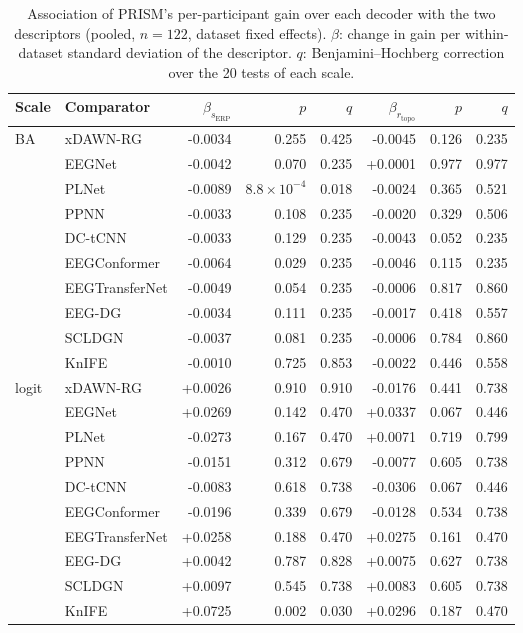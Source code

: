 \begin{table}[H]
\centering
\caption{Association of PRISM's per-participant gain over each decoder with the two descriptors (pooled, $n=122$, dataset fixed effects). $\beta$: change in gain per within-dataset standard deviation of the descriptor. $q$: Benjamini--Hochberg correction over the 20 tests of each scale.}
\label{tab:supp-gains}
\scriptsize
\begin{adjustbox}{max width=\textwidth}
\begin{tabular}{@{}llrrrrrr@{}}
\toprule
Scale & Comparator & $\beta_{s_\mathrm{ERP}}$ & $p$ & $q$ & $\beta_{r_\mathrm{topo}}$ & $p$ & $q$ \\
\midrule
\multirow{10}{*}{BA} & xDAWN-RG & -0.0034 & 0.255 & 0.425 & -0.0045 & 0.126 & 0.235 \\
 & EEGNet & -0.0042 & 0.070 & 0.235 & +0.0001 & 0.977 & 0.977 \\
 & PLNet & -0.0089 & $8.8\times10^{-4}$ & 0.018 & -0.0024 & 0.365 & 0.521 \\
 & PPNN & -0.0033 & 0.108 & 0.235 & -0.0020 & 0.329 & 0.506 \\
 & DC-tCNN & -0.0033 & 0.129 & 0.235 & -0.0043 & 0.052 & 0.235 \\
 & EEGConformer & -0.0064 & 0.029 & 0.235 & -0.0046 & 0.115 & 0.235 \\
 & EEGTransferNet & -0.0049 & 0.054 & 0.235 & -0.0006 & 0.817 & 0.860 \\
 & EEG-DG & -0.0034 & 0.111 & 0.235 & -0.0017 & 0.418 & 0.557 \\
 & SCLDGN & -0.0037 & 0.081 & 0.235 & -0.0006 & 0.784 & 0.860 \\
 & KnIFE & -0.0010 & 0.725 & 0.853 & -0.0022 & 0.446 & 0.558 \\
\midrule
\multirow{10}{*}{logit} & xDAWN-RG & +0.0026 & 0.910 & 0.910 & -0.0176 & 0.441 & 0.738 \\
 & EEGNet & +0.0269 & 0.142 & 0.470 & +0.0337 & 0.067 & 0.446 \\
 & PLNet & -0.0273 & 0.167 & 0.470 & +0.0071 & 0.719 & 0.799 \\
 & PPNN & -0.0151 & 0.312 & 0.679 & -0.0077 & 0.605 & 0.738 \\
 & DC-tCNN & -0.0083 & 0.618 & 0.738 & -0.0306 & 0.067 & 0.446 \\
 & EEGConformer & -0.0196 & 0.339 & 0.679 & -0.0128 & 0.534 & 0.738 \\
 & EEGTransferNet & +0.0258 & 0.188 & 0.470 & +0.0275 & 0.161 & 0.470 \\
 & EEG-DG & +0.0042 & 0.787 & 0.828 & +0.0075 & 0.627 & 0.738 \\
 & SCLDGN & +0.0097 & 0.545 & 0.738 & +0.0083 & 0.605 & 0.738 \\
 & KnIFE & +0.0725 & 0.002 & 0.030 & +0.0296 & 0.187 & 0.470 \\
\bottomrule
\end{tabular}
\end{adjustbox}
\end{table}
